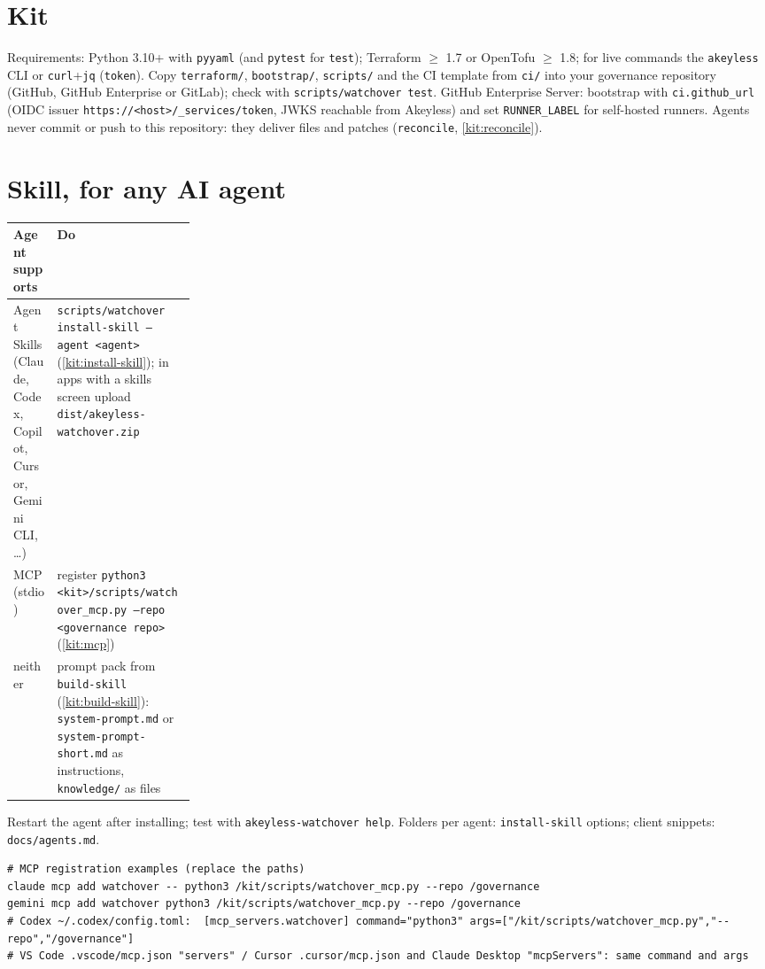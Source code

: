\documentclass[10pt,a4paper,openany]{report}
\begin{document}
\section{Kit}
Requirements: Python 3.10+ with \texttt{pyyaml} (and \texttt{pytest} for \texttt{test}); Terraform
$\geq$ 1.7 or OpenTofu $\geq$ 1.8; for live commands the \texttt{akeyless} CLI or \texttt{curl}+\texttt{jq}
(\texttt{token}). Copy \texttt{terraform/}, \texttt{bootstrap/}, \texttt{scripts/} and the CI template
from \texttt{ci/} into your governance repository (GitHub, GitHub Enterprise or GitLab); check with
\texttt{scripts/watchover test}. GitHub Enterprise Server: bootstrap with \texttt{ci.github\_url}
(OIDC issuer \texttt{https://<host>/\_services/token}, JWKS reachable from Akeyless) and set
\texttt{RUNNER\_LABEL} for self-hosted runners. Agents never commit or push to this repository: they deliver
files and patches (\texttt{reconcile}, \ref{kit:reconcile}).

\section{Skill, for any AI agent}
\begin{center}\small
\begin{tabularx}{\linewidth}{@{}>{\raggedright\arraybackslash}p{0.24\linewidth}>{\raggedright\arraybackslash}X@{}}
\toprule
\textbf{Agent supports} & \textbf{Do} \\ \midrule
Agent Skills (Claude, Codex, Copilot, Cursor, Gemini CLI, \ldots) & \texttt{scripts/watchover install-skill --agent <agent>} (\ref{kit:install-skill}); in apps with a skills screen upload \texttt{dist/akeyless-watchover.zip} \\
MCP (stdio) & register \texttt{python3 <kit>/scripts/watchover\_mcp.py --repo <governance repo>} (\ref{kit:mcp}) \\
neither & prompt pack from \texttt{build-skill} (\ref{kit:build-skill}): \texttt{system-prompt.md} or \texttt{system-prompt-short.md} as instructions, \texttt{knowledge/} as files \\
\bottomrule
\end{tabularx}
\end{center}
Restart the agent after installing; test with \texttt{akeyless-watchover help}. Folders per agent:
\texttt{install-skill} options; client snippets: \texttt{docs/agents.md}.

\begin{lstlisting}
# MCP registration examples (replace the paths)
claude mcp add watchover -- python3 /kit/scripts/watchover_mcp.py --repo /governance
gemini mcp add watchover python3 /kit/scripts/watchover_mcp.py --repo /governance
# Codex ~/.codex/config.toml:  [mcp_servers.watchover] command="python3" args=["/kit/scripts/watchover_mcp.py","--repo","/governance"]
# VS Code .vscode/mcp.json "servers" / Cursor .cursor/mcp.json and Claude Desktop "mcpServers": same command and args
\end{lstlisting}




\appendix

\end{document}
